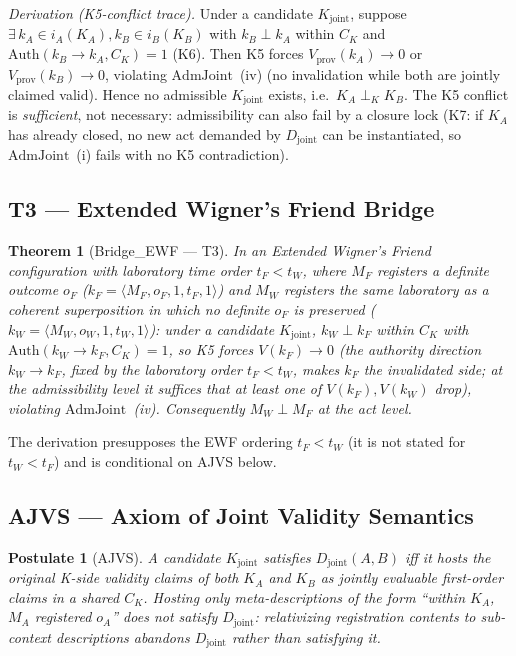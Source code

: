 \documentclass[12pt,a4paper]{article}
\theoremstyle{plain}
\newtheorem{postulate}{Postulate}[section]
\newtheorem{theorem}{Theorem}[section]
\theoremstyle{definition}
\theoremstyle{remark}
\newcommand{\Kjoint}{K_{\mathrm{joint}}}
\newcommand{\Vp}{V_{\mathrm{prov}}}
\newcommand{\CK}{C_K}
\newcommand{\Auth}{\mathrm{Auth}}
\newcommand{\bk}[1]{\langle #1 \rangle}
\begin{document}
\noindent\emph{Derivation (K5-conflict trace).}
Under a candidate $\Kjoint$, suppose $\exists\, k_A \in i_A(K_A),
k_B \in i_B(K_B)$ with $k_B \perp k_A$ within $\CK$ and
$\Auth(k_B \to k_A, \CK) = 1$ (K6). Then K5 forces $\Vp(k_A) \to 0$ or
$\Vp(k_B) \to 0$, violating $\mathrm{AdmJoint}$~(iv) (no invalidation while both
are jointly claimed valid). Hence no admissible $\Kjoint$ exists, i.e.\
$K_A \perp_K K_B$. The K5 conflict is \emph{sufficient}, not necessary:
admissibility can also fail by a closure lock (K7: if $K_A$ has already closed,
no new act demanded by $D_{\mathrm{joint}}$ can be instantiated, so
$\mathrm{AdmJoint}$~(i) fails with no K5 contradiction).

\subsection{T3 --- Extended Wigner's Friend Bridge}

\begin{theorem}[Bridge\_EWF --- T3]\label{thm:T3}
In an Extended Wigner's Friend configuration with laboratory time order
$t_F < t_W$, where $M_F$ registers a definite outcome $o_F$
($k_F = \bk{M_F, o_F, 1, t_F, 1}$) and $M_W$ registers the same laboratory as a
coherent superposition in which no definite $o_F$ is preserved
($k_W = \bk{M_W, o_W, 1, t_W, 1}$): under a candidate $\Kjoint$,
$k_W \perp k_F$ within $\CK$ with $\Auth(k_W \to k_F, \CK) = 1$, so K5 forces
$V(k_F) \to 0$ (the authority direction $k_W \to k_F$, fixed by the laboratory
order $t_F < t_W$, makes $k_F$ the invalidated side; at the admissibility level
it suffices that at least one of $V(k_F), V(k_W)$ drop), violating
$\mathrm{AdmJoint}$~(iv).
Consequently $M_W \perp M_F$ at the act level.
\end{theorem}

\noindent The derivation presupposes the EWF ordering $t_F < t_W$ (it is not
stated for $t_W < t_F$) and is conditional on AJVS below.

\subsection{AJVS --- Axiom of Joint Validity Semantics}

\begin{postulate}[AJVS]\label{post:AJVS}
A candidate $\Kjoint$ satisfies $D_{\mathrm{joint}}(A,B)$ iff it hosts the
\emph{original} K-side validity claims of both $K_A$ and $K_B$ as jointly
evaluable first-order claims in a shared $\CK$. Hosting only meta-descriptions
of the form ``within $K_A$, $M_A$ registered $o_A$'' does \emph{not} satisfy
$D_{\mathrm{joint}}$: relativizing registration contents to sub-context
descriptions abandons $D_{\mathrm{joint}}$ rather than satisfying it.
\end{postulate}
\end{document}
